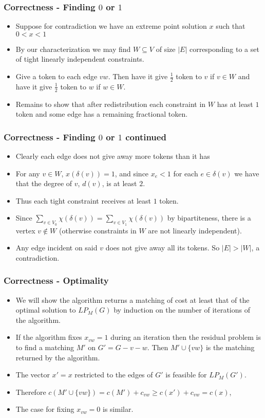 \documentclass{beamer}
\begin{document}
\begin{frame}
\frametitle{Correctness - Finding $0$ or $1$}
\begin{itemize}
\item<1-> Suppose for contradiction we have an extreme point solution $x$ such that $0 < x < 1$
\item<2-> By our characterization we may find $W \subseteq V$ of size $|E|$ corresponding to a set of tight linearly independent constraints.
\item<3-> Give a token to each edge $vw$. Then have it give $\frac{1}{2}$ token to $v$ if $v \in W$ and have it give $\frac{1}{2}$ token to $w$ if $w \in W$. 
\item<4->Remains to show that after redistribution each constraint in $W$ has at least $1$ token and some edge has a remaining fractional token.
\end{itemize}
\end{frame}
\begin{frame}
\frametitle{Correctness - Finding $0$ or $1$ continued}
\begin{itemize}
\item<1-> Clearly each edge does not give away more tokens than it has
\item<2-> For any $v \in W$, $x(\delta(v)) = 1$, and since $x_e < 1$ for each $e \in \delta(v)$ we have that the degree of $v$, $d(v)$, is at least $2$.
\item<3-> Thus each tight constraint receives at least $1$ token.
\item<4-> Since $\sum_{v \in V_0} \chi(\delta(v)) = \sum_{v \in V_1} \chi(\delta(v))$ by bipartiteness, there is a vertex $v \not\in W$ (otherwise constraints in $W$ are not linearly independent).
\item<5-> Any edge incident on said $v$ does not give away all its tokens. So $|E| > |W|$, a contradiction.
\end{itemize}
\end{frame}

\begin{frame}
\frametitle{Correctness - Optimality}
\begin{itemize}
\item<1-> We will show the algorithm returns a matching of cost at least that of the optimal solution to $LP_M(G)$ by induction on the number of iterations of the algorithm.
\item<2-> If the algorithm fixes $x_{vw} = 1$ during an iteration then the residual problem is to find a matching $M'$ on $G'=G-v-w$. Then $M' \cup \{vw\}$ is the matching returned by the algorithm.
\item<3-> The vector $x' = x$ restricted to the edges of $G'$ is feasible for $LP_M(G')$.
\item<4-> Therefore $c(M' \cup \{vw\}) = c(M') + c_{vw} \geq c(x') + c_{vw} = c(x)$,
\item<5-> The case for fixing $x_{vw} = 0$ is similar.
\end{itemize}
\end{frame}
\end{document}
